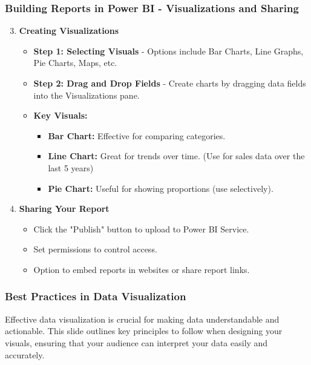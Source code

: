 \documentclass[aspectratio=169]{beamer}
\begin{document}
\begin{frame}[fragile]
    \frametitle{Building Reports in Power BI - Visualizations and Sharing}
    \begin{enumerate}
        \setcounter{enumi}{2}
        \item \textbf{Creating Visualizations}
            \begin{itemize}
                \item \textbf{Step 1: Selecting Visuals} - Options include Bar Charts, Line Graphs, Pie Charts, Maps, etc.
                \item \textbf{Step 2: Drag and Drop Fields} - Create charts by dragging data fields into the Visualizations pane.
                \item \textbf{Key Visuals:}
                    \begin{itemize}
                        \item \textbf{Bar Chart:} Effective for comparing categories.
                        \item \textbf{Line Chart:} Great for trends over time. (Use for sales data over the last 5 years)
                        \item \textbf{Pie Chart:} Useful for showing proportions (use selectively).
                    \end{itemize}
            \end{itemize}
        \item \textbf{Sharing Your Report}
            \begin{itemize}
                \item Click the "Publish" button to upload to Power BI Service.
                \item Set permissions to control access.
                \item Option to embed reports in websites or share report links.
            \end{itemize}
    \end{enumerate}
\end{frame}

\begin{frame}[fragile]
    \frametitle{Best Practices in Data Visualization}
    Effective data visualization is crucial for making data understandable and actionable. This slide outlines key principles to follow when designing your visuals, ensuring that your audience can interpret your data easily and accurately.
\end{frame}
\end{document}
